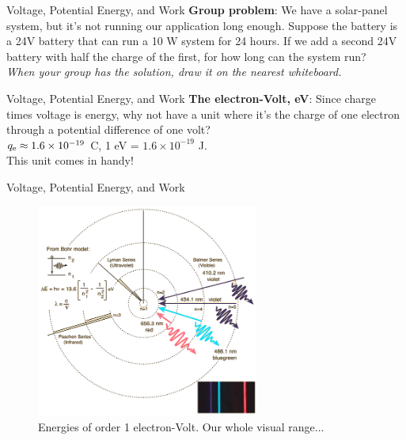 \documentclass{beamer}
\begin{document}
\begin{frame}{Voltage, Potential Energy, and Work}
\textbf{Group problem}: We have a solar-panel system, but it's not running our application long enough.  Suppose the battery is a 24V battery that can run a 10 W system for 24 hours.  If we add a second 24V battery with half the charge of the first, for how long can the system run? \\ \vspace{0.5cm}
\textit{When your group has the solution, draw it on the nearest whiteboard.}
\end{frame}

\begin{frame}{Voltage, Potential Energy, and Work}
\textbf{The electron-Volt, eV}: Since charge times voltage is energy, why not have a unit where it's the charge of one electron through a potential difference of one volt? \\ \vspace{0.5cm}
$q_{\rm e} \approx 1.6 \times 10^{-19}$ C, 1 eV = $1.6 \times 10^{-19}$ J. \\ \vspace{0.5cm}
This unit comes in handy!
\end{frame}

\begin{frame}{Voltage, Potential Energy, and Work}
\begin{figure}
\centering
\includegraphics[width=0.65\textwidth]{figures/H.png}
\caption{\label{fig:H} Energies of order 1 electron-Volt. Our whole visual range...}
\end{figure}
\end{frame}
\end{document}
